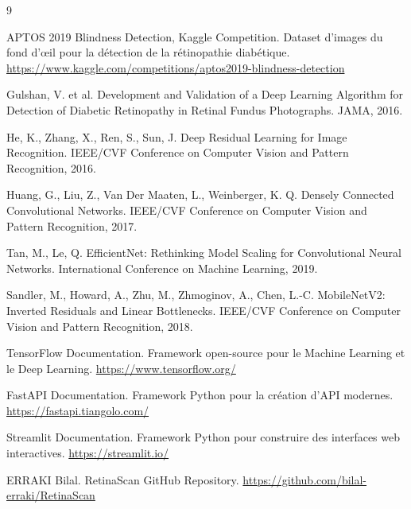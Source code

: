 \documentclass[12pt,a4paper]{report}
\begin{document}
\begin{thebibliography}{9}

APTOS 2019 Blindness Detection, Kaggle Competition. Dataset d'images du fond d'œil pour la détection de la rétinopathie diabétique.
\url{https://www.kaggle.com/competitions/aptos2019-blindness-detection}

Gulshan, V. et al. Development and Validation of a Deep Learning Algorithm for Detection of Diabetic Retinopathy in Retinal Fundus Photographs. JAMA, 2016.

He, K., Zhang, X., Ren, S., Sun, J. Deep Residual Learning for Image Recognition. IEEE/CVF Conference on Computer Vision and Pattern Recognition, 2016.

Huang, G., Liu, Z., Van Der Maaten, L., Weinberger, K. Q. Densely Connected Convolutional Networks. IEEE/CVF Conference on Computer Vision and Pattern Recognition, 2017.

Tan, M., Le, Q. EfficientNet: Rethinking Model Scaling for Convolutional Neural Networks. International Conference on Machine Learning, 2019.

Sandler, M., Howard, A., Zhu, M., Zhmoginov, A., Chen, L.-C. MobileNetV2: Inverted Residuals and Linear Bottlenecks. IEEE/CVF Conference on Computer Vision and Pattern Recognition, 2018.

TensorFlow Documentation. Framework open-source pour le Machine Learning et le Deep Learning.
\url{https://www.tensorflow.org/}

FastAPI Documentation. Framework Python pour la création d'API modernes.
\url{https://fastapi.tiangolo.com/}

Streamlit Documentation. Framework Python pour construire des interfaces web interactives.
\url{https://streamlit.io/}

ERRAKI Bilal. RetinaScan GitHub Repository.
\url{https://github.com/bilal-erraki/RetinaScan}

\end{thebibliography}
\end{document}
